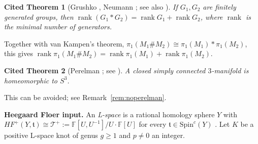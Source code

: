 \documentclass[11pt]{article}
\newtheorem{citedthm}{Cited Theorem}
\theoremstyle{definition}
\newcommand{\F}{\mathbb{F}}
\newcommand{\Tp}{\mathcal{T}^+}
\newcommand{\HFp}{\mathit{HF}^+}
\newcommand{\Spinc}{\mathrm{Spin}^c}
\newcommand{\rk}{\operatorname{rank}}
\begin{document}
\begin{citedthm}[Grushko \cite{Grushko}, Neumann \cite{Neumann}; see also \cite{LS}]\label{thm:grushko}
If $G_1,G_2$ are finitely generated groups, then $\rk(G_1*G_2)=\rk G_1+\rk G_2$, where $\rk$ is the minimal number of generators.
\end{citedthm}
Together with van Kampen's theorem, $\pi_1(M_1\# M_2)\cong\pi_1(M_1)*\pi_1(M_2)$, this gives $\rk\pi_1(M_1\#M_2)=\rk\pi_1(M_1)+\rk\pi_1(M_2)$.

\begin{citedthm}[Perelman \cite{Perelman1,Perelman2,Perelman3}; see \cite{MorganTian}]\label{thm:perelman}
A closed simply connected $3$-manifold is homeomorphic to $S^3$.
\end{citedthm}
This can be avoided; see Remark~\ref{rem:noperelman}.

\medskip
\noindent\textbf{Heegaard Floer input.} An \emph{L-space} is a rational homology sphere $Y$ with $\HFp(Y,\mathfrak t)\cong\Tp:=\F[U,U^{-1}]/U\cdot\F[U]$ for every $\mathfrak t\in\Spinc(Y)$ \cite{OSlens}. Let $K$ be a positive L-space knot of genus $g\ge1$ and $p\ne0$ an integer.
\end{document}
